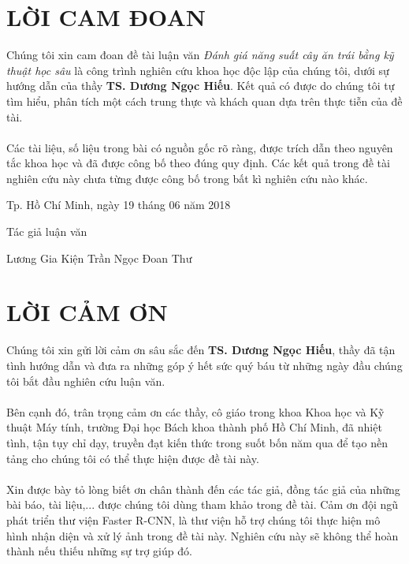 \documentclass[a4paper,12pt,oneside]{ThesisStyle}
\begin{document}


\dominitoc


\cleardoublepage

\chapter*{LỜI CAM ĐOAN}
Chúng tôi xin cam đoan đề tài luận văn \textit{Đánh giá năng suất cây ăn trái bằng kỹ thuật học sâu} là công trình nghiên cứu khoa học độc lập của chúng tôi, dưới sự hướng dẫn của thầy \textbf{TS. Dương Ngọc Hiếu}. Kết quả có được do chúng tôi tự tìm hiểu, phân tích một cách trung thực và khách quan dựa trên thực tiễn của đề tài.
\\
\\
Các tài liệu, số liệu trong bài có nguồn gốc rõ ràng, được trích dẫn theo nguyên tắc khoa học và đã được công bố theo đúng quy định. Các kết quả trong đề tài nghiên cứu này chưa từng được công bố trong bất kì nghiên cứu nào khác.


\begin{flushright}
Tp. Hồ Chí Minh, ngày 19 tháng 06 năm 2018
\end{flushright}
\hspace{10cm} Tác giả luận văn \\
\vspace{3cm}





\hfill Lương Gia Kiện \hspace{2cm} Trần Ngọc Đoan Thư

\cleardoublepage

\chapter*{LỜI CẢM ƠN}
Chúng tôi xin gửi lời cảm ơn sâu sắc đến \textbf{TS. Dương Ngọc Hiếu}, thầy đã tận tình hướng dẫn và đưa ra những góp ý hết sức quý báu từ những ngày đầu chúng tôi bắt đầu nghiên cứu luận văn.
\\
\\
Bên cạnh đó, trân trọng cảm ơn các thầy, cô giáo trong khoa Khoa học và Kỹ thuật Máy tính, trường Đại học Bách khoa thành phố Hồ Chí Minh, đã nhiệt tình, tận tụy chỉ dạy, truyền đạt kiến thức trong suốt bốn năm qua để tạo nền tảng cho chúng tôi có thể thực hiện được đề tài này.
\\
\\
Xin được bày tỏ lòng biết ơn chân thành đến các tác giả, đồng tác giả của những bài báo, tài liệu,... được chúng tôi dùng tham khảo trong đề tài. Cảm ơn đội ngũ phát triển thư viện Faster R-CNN, là thư viện hỗ trợ chúng tôi thực hiện mô hình nhận diện và xử lý ảnh trong đề tài này. Nghiên cứu này sẽ không thể hoàn thành nếu thiếu những sự trợ giúp đó.
\end{document}
